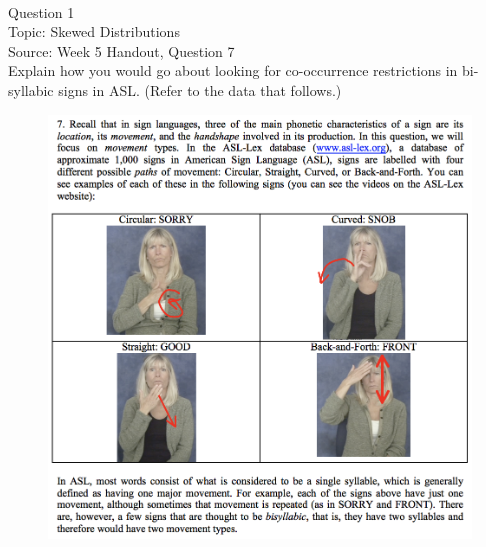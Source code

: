 \documentclass[12pt]{article}
\begin{document}
\newpage

\begin{center}
\textbf{{\color{red}{\HUGE END OF EXAM}}}\\

\end{center}
\newpage

\begin{center}
\textbf{{\color{blue}{\HUGE START OF EXAM\\}}}

\textbf{{\color{blue}{\HUGE Student ID: 48894\\}}}

\textbf{{\color{blue}{\HUGE 4:10\\}}}

\end{center}
\newpage

{\large Question 1}\\

Topic: Skewed Distributions\\
Source: Week 5 Handout, Question 7\\

Explain how you would go about looking for co-occurrence restrictions in bi-syllabic signs in ASL. (Refer to the data that follows.)\\

\begin{figure}[H]
\includegraphics{../images/ASL_movement.png}
\end{figure}
\end{document}
